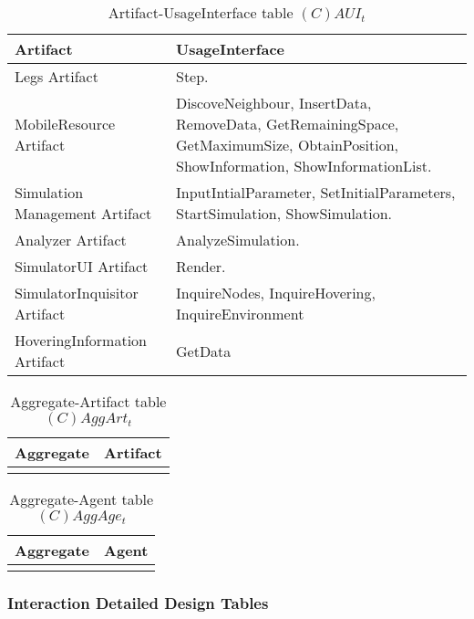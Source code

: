 \begin{table}[H]
	\centering
	\begin{tabular}{|p{4cm}|p{8cm}|}
			\hline
			\textbf{Artifact} & \textbf{UsageInterface} \\
			\hline
			Legs Artifact & Step. \\
			\hline
			MobileResource Artifact & DiscoveNeighbour, InsertData, RemoveData,
			GetRemainingSpace, GetMaximumSize, ObtainPosition, ShowInformation,
			ShowInformationList. \\
			\hline
			Simulation Management Artifact & InputIntialParameter,
			SetInitialParameters, StartSimulation, ShowSimulation. \\
			\hline
			Analyzer Artifact & AnalyzeSimulation. \\
			\hline
			SimulatorUI Artifact & Render. \\
			\hline
			SimulatorInquisitor Artifact & InquireNodes, InquireHovering,
			InquireEnvironment \\
			\hline
			HoveringInformation Artifact & GetData \\
			\hline
		\end{tabular}
	\caption{Artifact-UsageInterface table $(C)AUI_t$}
	\label{tab:cauit}
\end{table}

\begin{table}[H]
	\centering
	\begin{tabular}{|p{4cm}|p{8cm}|}
			\hline
			\textbf{Aggregate} & \textbf{Artifact} \\
			\hline
			& \\
			\hline
		\end{tabular}
	\caption{Aggregate-Artifact table $(C)AggArt_t$}
	\label{tab:caggartt}
\end{table}

\begin{table}[H]
	\centering
	\begin{tabular}{|p{4cm}|p{8cm}|}
			\hline
			\textbf{Aggregate} & \textbf{Agent} \\
			\hline
			& \\
			\hline
		\end{tabular}
	\caption{Aggregate-Agent table $(C)AggAge_t$}
	\label{tab:caggaget}
\end{table}

\subsubsection{Interaction Detailed Design Tables}

